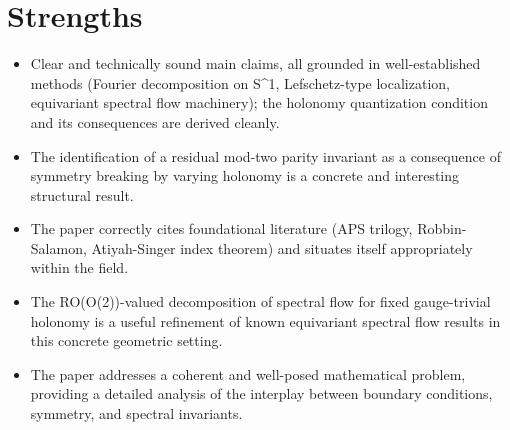 \documentclass[11pt]{article}
\begin{document}
\section*{Strengths}
\begin{itemize}[leftmargin=*]
  \item Clear and technically sound main claims, all grounded in well-established methods (Fourier decomposition on S\^{}1, Lefschetz-type localization, equivariant spectral flow machinery); the holonomy quantization condition and its consequences are derived cleanly.
  \item The identification of a residual mod-two parity invariant as a consequence of symmetry breaking by varying holonomy is a concrete and interesting structural result.
  \item The paper correctly cites foundational literature (APS trilogy, Robbin-Salamon, Atiyah-Singer index theorem) and situates itself appropriately within the field.
  \item The RO(O(2))-valued decomposition of spectral flow for fixed gauge-trivial holonomy is a useful refinement of known equivariant spectral flow results in this concrete geometric setting.
  \item The paper addresses a coherent and well-posed mathematical problem, providing a detailed analysis of the interplay between boundary conditions, symmetry, and spectral invariants.
\end{itemize}
\end{document}
